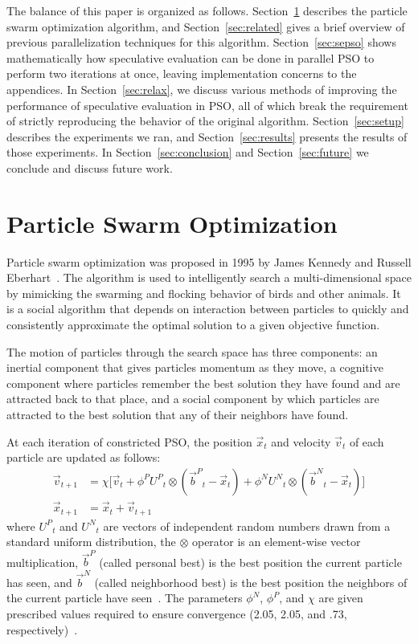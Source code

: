\documentclass[ms,electronic,twosidetoc,letterpaper,chaptercenter,parttop,equalmargins]{byumsphd}
\renewcommand{\sec}[1]{Section~\ref{sec:#1}}
\providecommand{\pers}{\ensuremath{P}}
\providecommand{\neigh}{\ensuremath{N}}
\providecommand{\nURand}{\ensuremath{U^\neigh}}
\providecommand{\pURand}{\ensuremath{U^\pers}}
\providecommand{\ppos}{\ensuremath{\Vec{x}}}
\providecommand{\pvel}{\ensuremath{\Vec{v}}}
\providecommand{\nbest}{\ensuremath{\Vec{b}^\neigh}}
\providecommand{\pbest}{\ensuremath{\Vec{b}^\pers}}
\providecommand{\constriction}{\ensuremath{\chi}}
\providecommand{\ncoeff}{\ensuremath{\phi^\neigh}}
\providecommand{\pcoeff}{\ensuremath{\phi^\pers}}
\begin{document}
The balance of this paper is organized as follows. \sec{pso} describes the
particle swarm optimization algorithm, and \sec{related} gives a brief overview
of previous parallelization techniques for this algorithm.  \sec{sepso} shows
mathematically how speculative evaluation can be done in parallel PSO to
perform two iterations at once, leaving implementation concerns to the
appendices.  In \sec{relax}, we discuss various methods of improving the
performance of speculative evaluation in PSO, all of which break the
requirement of strictly reproducing the behavior of the original algorithm.
\sec{setup} describes the experiments we ran, and \sec{results} presents the
results of those experiments.  In \sec{conclusion} and \sec{future} we conclude
and discuss future work.

\section{Particle Swarm Optimization}
\label{sec:pso}

Particle swarm optimization was proposed in 1995 by James Kennedy and Russell
Eberhart~\citep{kennedy-1995-particle-swarm-optimization}.  The algorithm is
used to intelligently search a multi-dimensional space by mimicking the
swarming and flocking behavior of birds and other animals. It is a social
algorithm that depends on interaction between particles to quickly and
consistently approximate the optimal solution to a given objective function.

The motion of particles through the search space has three components: an
inertial component that gives particles momentum as they move, a cognitive
component where particles remember the best solution they have found and are
attracted back to that place, and a social component by which particles are
attracted to the best solution that any of their neighbors have found.

At each iteration of constricted PSO, the position $\ppos_t$ and velocity
$\pvel_t$ of each particle are updated as follows:
\begin{align}
\label{eq:velupdate}
	\pvel_{t+1} &=
		\constriction \bigl[ \pvel_t
			+ \pcoeff\pURand_{t}\otimes(\pbest_{t} - \ppos_{t}) +
			\ncoeff\nURand_{t}\otimes(\nbest_{t} - \ppos_{t})
		\bigr] \\
\label{eq:posupdate}
	\ppos_{t+1} &= \ppos_{t} + \pvel_{t+1}
\end{align}
where \( \pURand_{t} \) and \( \nURand_{t} \) are vectors of independent random
numbers drawn from a standard uniform distribution, the \( \otimes \) operator
is an element-wise vector multiplication, $\pbest$ (called personal best) is
the best position the current particle has seen, and $\nbest$ (called
neighborhood best) is the best position the neighbors of the current particle
have seen~\citep{bratton-2007-defining-a-standard-for-pso}.  The parameters \(
\ncoeff \), \( \pcoeff \), and \( \constriction \) are given prescribed values
required to ensure convergence (2.05, 2.05, and .73,
respectively)~\citep{clerc-2002-constricted-pso}.
\end{document}

